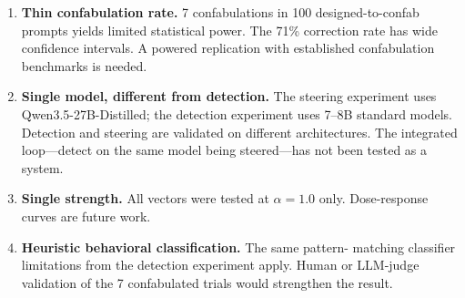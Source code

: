 \begin{enumerate}[nosep]
  \item \textbf{Thin confabulation rate.} 7 confabulations in 100
    designed-to-confab prompts yields limited statistical power. The
    71\% correction rate has wide confidence intervals. A powered
    replication with established confabulation benchmarks is needed.
  \item \textbf{Single model, different from detection.} The steering
    experiment uses Qwen3.5-27B-Distilled; the detection experiment uses
    7--8B standard models. Detection and steering are validated on
    different architectures. The integrated loop---detect on the same
    model being steered---has not been tested as a system.
  \item \textbf{Single strength.} All vectors were tested at
    $\alpha = 1.0$ only. Dose-response curves are future work.
  \item \textbf{Heuristic behavioral classification.} The same pattern-
    matching classifier limitations from the detection experiment
    apply. Human or LLM-judge validation of the 7 confabulated trials
    would strengthen the result.
\end{enumerate}
